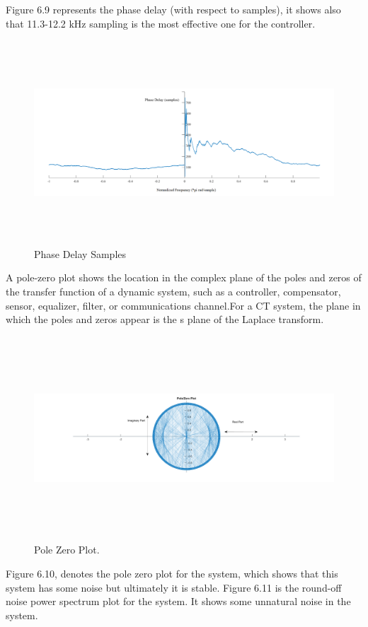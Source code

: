 Figure 6.9 represents the phase delay (with respect to samples), it shows also that 11.3-12.2 kHz sampling is the most effective one for the controller.
\begin{figure}[H]
	\begin{Center}
		\includegraphics[width=6.5in,height=3in]{23}
		\caption{Phase Delay Samples}
		\label{fig:_9_Phase_Delay_Samples}
	\end{Center}
\end{figure}
A pole-zero plot shows the location in the complex plane of the poles and zeros of the transfer function of a dynamic system, such as a controller, compensator, sensor, equalizer, filter, or communications channel.For a CT system, the plane in which the poles and zeros appear is the s plane of the Laplace transform.
\begin{figure}[H]
	\begin{Center}
		\includegraphics[width=6.5in,height=3in]{24}
	\end{Center}
\caption{Pole Zero Plot.}
\end{figure}
Figure 6.10, denotes the pole zero plot for the system, which shows that this system has some noise but ultimately it is stable. Figure 6.11 is the round-off noise power spectrum plot for the system. It shows some unnatural noise in the system.\\

